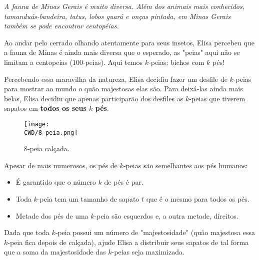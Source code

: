 %

\begin{center}
\textit{
  A fauna de Minas Gerais é muito diversa. Além dos animais mais conhecidos, tamanduás-bandeira, tatus, lobos guará e onças pintada, em Minas Gerais também se pode encontrar centopéias. 
  }
\end{center}
  
  Ao andar pelo cerrado olhando atentamente para seus insetos, Elisa percebeu que a fauna de Minas é ainda mais diversa que o esperado, as "peias"  aqui não se limitam a centopeias ($100$-peias). Aqui temos $k$-peias: bichos com $k$ pés!
    
  Percebendo essa maravilha da natureza, Elisa decidiu fazer um desfile de $k$-peias para mostrar ao mundo o quão majestosas elas são. Para deixá-las ainda mais belas, Elisa decidiu que apenas participarão dos desfiles as $k$-peias que tiverem sapatos em \textbf{todos os seus $k$ pés}. 
  
  \begin{figure}[H]
    \centering
    \texttt{[image: \\CWD/8-peia.png]}
    \caption{8-peia calçada.}
  \end{figure}

  Apesar de mais numerosos, os pés de $k$-peias são semelhantes aos pés humanos:
\begin{itemize}
  \item É garantido que o número $k$ de pés é par.
  \item Toda $k$-peia tem um tamanho de sapato $t$ que é o mesmo para todos os pés.
  \item Metade dos pés de uma $k$-peia são esquerdos e, a outra metade, direitos.
\end{itemize}

Dada que toda $k$-peia possui um número de "majestosidade"  (quão majestosa essa $k$-peia fica depois de calçada), ajude Elisa a distribuir seus sapatos de tal forma que a soma da majestosidade das $k$-peias seja maximizada.

%

